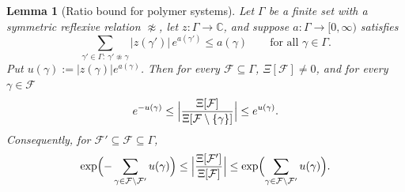 \documentclass[11pt,a4paper]{article}
\newtheorem{lemma}[theorem]{Lemma}
\theoremstyle{definition}
\theoremstyle{remark}
\newcommand{\C}{\mathbb{C}}
\begin{document}
\begin{lemma}[Ratio bound for polymer systems]\label{al:lem:ratio}
Let $\Gamma$ be a finite set with a symmetric reflexive relation $\not\approx$, let $z:\Gamma\to\C$, and suppose
$a:\Gamma\to[0,\infty)$ satisfies
\begin{equation}\label{al:eq:KP}
\sum_{\gamma'\in\Gamma:\ \gamma'\not\approx\gamma}|z(\gamma')|\,e^{a(\gamma')}\le a(\gamma)\qquad\text{for all }\gamma\in\Gamma .
\end{equation}
Put $u(\gamma):=|z(\gamma)|e^{a(\gamma)}$. Then for every $\mathcal F\subseteq\Gamma$, $\Xi[\mathcal F]\neq0$, and for
every $\gamma\in\mathcal F$
\begin{equation}\label{al:eq:onestep}
e^{-u(\gamma)}\le\Bigl|\frac{\Xi[\mathcal F]}{\Xi[\mathcal F\setminus\{\gamma\}]}\Bigr|\le e^{u(\gamma)} .
\end{equation}
Consequently, for $\mathcal F'\subseteq\mathcal F\subseteq\Gamma$,
\[
\exp\Bigl(-\sum_{\gamma\in\mathcal F\setminus\mathcal F'}u(\gamma)\Bigr)\le\Bigl|\frac{\Xi[\mathcal F']}{\Xi[\mathcal F]}\Bigr|
\le\exp\Bigl(\sum_{\gamma\in\mathcal F\setminus\mathcal F'}u(\gamma)\Bigr).
\]
\end{lemma}
\end{document}
